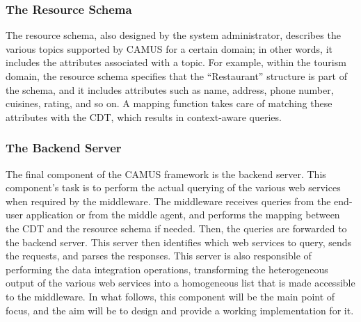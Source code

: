 \subsubsection{The Resource Schema}
The resource schema, also designed by the system administrator, describes the various topics supported by CAMUS for a certain domain; in other words, it includes the attributes associated with a topic. For example, within the tourism domain, the resource schema specifies that the ``Restaurant'' structure is part of the schema, and it includes attributes such as name, address, phone number, cuisines, rating, and so on. A mapping function takes care of matching these attributes with the CDT, which results in context-aware queries.
\subsubsection{The Backend Server}
The final component of the CAMUS framework is the backend server. This component's task is to perform the actual querying of the various web services when required by the middleware. The middleware receives queries from the end-user application or from the middle agent, and performs the mapping between the CDT and the resource schema if needed. Then, the queries are forwarded to the backend server. This server then identifies which web services to query, sends the requests, and parses the responses. This server is also responsible of performing the data integration operations, transforming the heterogeneous output of the various web services into a homogeneous list that is made accessible to the middleware. In what follows, this component will be the main point of focus, and the aim will be to design and provide a working implementation for it.
